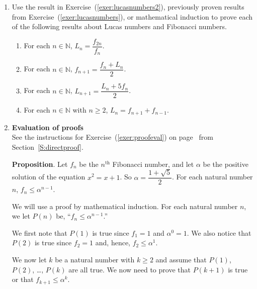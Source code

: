 \begin{enumerate}
\item Use the result in Exercise~(\ref{exer:lucasnumbers2}), previously proven results from Exercise~(\ref{exer:lucasnumbers}), or mathematical induction to prove each of the following results about Lucas numbers and Fibonacci numbers.
\begin{enumerate}
\item For each  $n \in \mathbb{N}$,  $L_n  = \dfrac{{f_{2n} }}{{f_n }}$.


\item For each  $n \in \mathbb{N}$,  $f_{n+1}  = \dfrac{f_n + L_n}{2}$.

\item For each  $n \in \mathbb{N}$,  $L_{n+1} = \dfrac{L_n +5f_n}{2}$.

\item For each  $n \in \mathbb{N}$ with $n \geq 2$,  $L_n = f_{n+1} + f_{n-1}$.

\end{enumerate}


\item \textbf{Evaluation of proofs}  \hfill \\
See the instructions for Exercise~(\ref{exer:proofeval}) on 
page~\pageref{exer:proofeval} from Section~\ref{S:directproof}.

\noindent
\textbf{Proposition}. Let $f_n$ be the $n^\text{th}$ Fibonacci number, and let $\alpha$ be the positive solution of the equation $x^2 = x + 1$.  So $\alpha = \dfrac{1 + \sqrt{5}}{2}$.  For each natural number 
$n$, $f_n \leq \alpha^{n-1}$.

\begin{myproof}
We will use a proof by mathematical induction.  For each natural number $n$, we let 
$P( n )$ be, ``$f_n \leq \alpha^{n-1}$.''

We first note that $P( 1 )$ is true since $f_1 = 1$ and $\alpha^0 = 1$.  We also notice that 
$P( 2 )$ is true since $f_2 = 1$ and, hence, $f_2 \leq \alpha^1$.

We now let $k$ be a natural number with $k \geq 2$ and assume that $P ( 1 )$, 
$P( 2 )$, \ldots , $P( k )$ are all true.  We now need to prove that 
$P \left( k + 1 \right)$ is true or that $f_{k+1} \leq \alpha^k$.


\end{myproof}
\end{enumerate}
